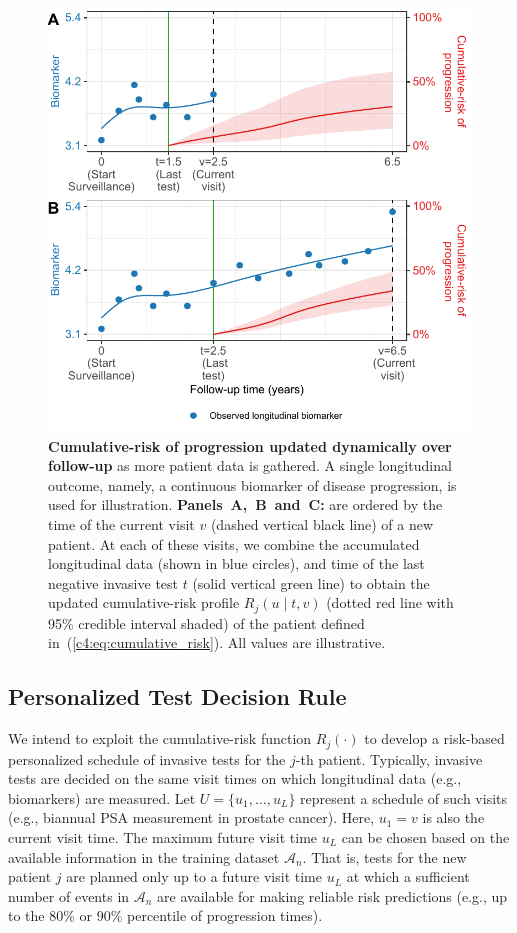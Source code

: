 \begin{figure}
\centerline{\includegraphics{contents/c4/images/c4_fig2.pdf}}
\caption{\textbf{Cumulative-risk of progression updated dynamically over follow-up} as more patient data is gathered. A single longitudinal outcome, namely, a continuous biomarker of disease progression, is used for illustration. \textbf{Panels~A,~B~and~C:} are ordered by the time of the current visit $v$ (dashed vertical black line) of a new patient. At each of these visits, we combine the accumulated longitudinal data (shown in blue circles), and time of the last negative invasive test $t$ (solid vertical green line) to obtain the updated cumulative-risk profile $R_j(u \mid t, v)$ (dotted red line with 95\% credible interval shaded) of the patient defined in~(\ref{c4:eq:cumulative_risk}). All values are illustrative.}
\label{c4:fig:2}
\end{figure}

\subsection{Personalized Test Decision Rule} 
\label{c4:subsec:pers_schedule}
We intend to exploit the cumulative-risk function $R_j(\cdot)$ to develop a risk-based personalized schedule of invasive tests for the $j$-th patient. Typically, invasive tests are decided on the same visit times on which longitudinal data (e.g., biomarkers) are measured. Let $U = \{u_1, \ldots, u_L\}$ represent a schedule of such visits (e.g., biannual PSA measurement in prostate cancer). Here, $u_1 = v$ is also the current visit time. The maximum future visit time $u_L$ can be chosen based on the available information in the training dataset $\mathcal A_n$. That is, tests for the new patient $j$ are planned only up to a future visit time $u_L$ at which a sufficient number of events in $\mathcal A_n$ are available for making reliable risk predictions (e.g., up to the 80\% or 90\% percentile of progression times).

